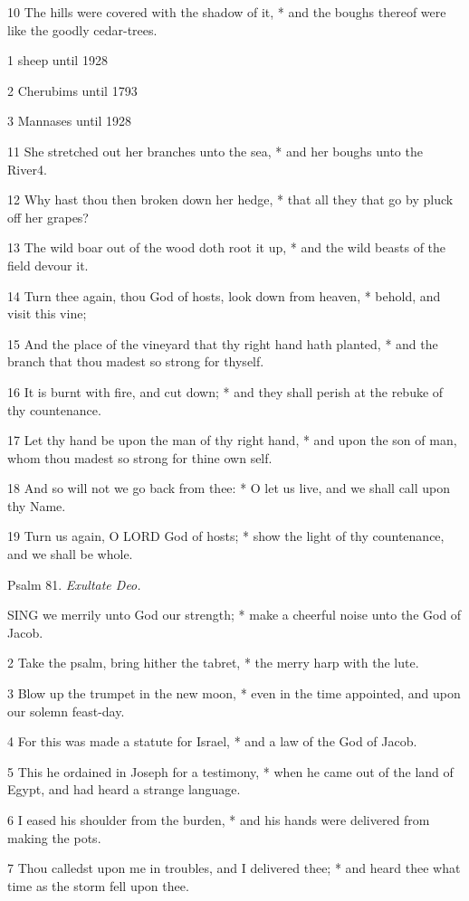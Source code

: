 10 The hills were covered with the shadow of it, *
and the boughs thereof were like the goodly cedar-trees.

1 sheep
until 1928

2 Cherubims
until 1793

3
Mannases
until 1928

11 She stretched out her branches unto the sea, * and her boughs unto
the River4.

12 Why hast thou then broken down her hedge, * that
all they that go by pluck off her grapes?

13 The wild boar out of the wood doth root it up, *
and the wild beasts of the field devour it.

14 Turn thee again, thou God of hosts, look down from
heaven, * behold, and visit this vine;

15 And the place of the vineyard that thy right hand
hath planted, * and the branch that thou madest so strong for thyself.

16 It is burnt with fire, and cut down; * and they
shall perish at the rebuke of thy countenance.

17 Let thy hand be upon the man of thy right hand,
* and upon the son of man, whom thou madest so strong for thine own self.

18 And so will not we go back from thee: * O let us
live, and we shall call upon thy Name.

19 Turn us again, O LORD God of hosts; * show the light
of thy countenance, and we shall be whole.

Psalm
81. \emph{Exultate Deo.}

SING
we merrily unto God our strength; * make a cheerful noise unto the God
of Jacob.

2 Take the psalm, bring hither the tabret, * the merry
harp with the lute.

3 Blow up the trumpet in the new moon, * even in the
time appointed, and upon our solemn feast-day.

4 For this was made a statute for Israel, * and a law
of the God of Jacob.

5 This he ordained in Joseph for a testimony, * when
he came out of the land of Egypt, and had heard a strange language.

6 I eased his shoulder from the burden, * and his hands
were delivered from making the pots.

7 Thou calledst upon me in troubles, and I delivered
thee; * and heard thee what time as the storm fell upon thee.

